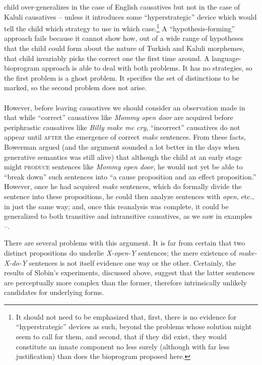 child over-generalizes in the case of English causatives but not in the case of Kaluli causatives -- unless it introduces some ``hyperstrategic'' device which would tell the child which strategy to use in which case.\footnote{It should not need to be emphasized that, first, there is no evidence for ``hyperstrategic'' devices as such, beyond the problems whose solution might seem to call for them, and second, that if they did exist, they would constitute an innate component no less surely (although with far less justification) than does the bioprogram proposed here.} A ``hypothesis-forming'' approach fails because it cannot show how, out of a wide range of hypotheses that the child could form about the nature of Turkish and Kaluli morphemes, that child invariably picks the correct one the first time around. A language-bioprogram approach is able to deal with both problems. It has no strategies, so the first problem is a ghost problem. It specifies the set of distinctions to be marked, so the second problem does not arise.\\\\

However, before leaving causatives we should consider an observation made in \citet{Bowerman1974} that while ``correct'' causatives like \textit{Mommy open door} are acquired before periphrastic causatives like \textit{Billy make me cry}, ``incorrect'' causatives do not appear until \textsc{after} the emergence of correct \textit{make} sentences. From these facts, Bowerman argued (and the argument sounded a lot better in the days when genera\-tive semantics was still alive) that although the child at an early stage might \textsc{produce} sentences like \textit{Mommy open door}, he would not yet be able to ``break down'' such sentences into ``a cause proposition and an effect proposition.'' However, once he had acquired \textit{make} sentences, which do formally divide the sentence into these proposi\-tions, he could then analyze sentences with \textit{open}, etc., in just the same way; and, once this reanalysis was complete, it could be generalized to both transitive and intransitive causatives, as we saw in examples --.

There are several problems with this argument. It is far from certain that two distinct propositions do underlie \textit{X-open-Y} sentences; the mere existence of \textit{make-X-do-Y} sentences is not itself evidence one way or the other. Certainly, the results of Slobin's experiments, discussed above, suggest that the latter sentences are perceptually more complex than the former, therefore intrinsically unlikely candidates for underlying forms.

